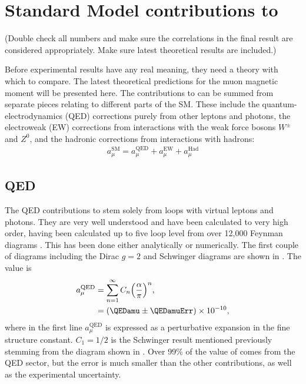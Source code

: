 \section{Standard Model contributions to \amu}
\label{sec:Theory}

(Double check all numbers and make sure the correlations in the final result are considered appropriately. Make sure latest theoretical results are included.)

Before experimental results have any real meaning, they need a theory with which to compare. The latest theoretical predictions for the muon magnetic moment will be presented here. The contributions to \amu can be summed from separate pieces relating to different parts of the SM. These include the quantum-electrodynamics (QED) corrections purely from other leptons and photons, the electroweak (EW) corrections from interactions with the weak force bosons $W^{\pm}$ and $Z^{0}$, and the hadronic corrections from interactions with hadrons: 
		\begin{align}
            a_{\mu}^{\text{SM}} = a_{\mu}^{\text{QED}} + a_{\mu}^{\text{EW}} + a_{\mu}^{\text{Had}}
		\end{align}


\subsection{QED}
\label{subsec:QED}

The QED contributions to \amu stem solely from loops with virtual leptons and photons. They are very well understood and have been calculated to very high order, having been calculated up to five loop level from over 12,000 Feynman diagrams \cite{Kinoshita1,Kinoshita2}. This has been done either analytically or numerically. The first couple of diagrams including the Dirac $g = 2$ and Schwinger diagrams are shown in . The value is
		\begin{equation}
		\begin{aligned}
            a_{\mu}^{\text{QED}} &= \sum_{n=1}^{\infty} C_{n} \Big( \frac{\alpha}{\pi} \Big)^{n}, \\
            					 &= (\QEDamu \pm \QEDamuErr) \times 10^{-10},
		\end{aligned}
		\end{equation}
where in the first line $a_{\mu}^{\text{QED}}$ is expressed as a perturbative expansion in the fine structure constant. $C_{1} = 1/2$ is the Schwinger result mentioned previously stemming from the diagram shown in . Over 99\% of the value of \amu comes from the QED sector, but the error is much smaller than the other contributions, as well as the experimental uncertainty.

